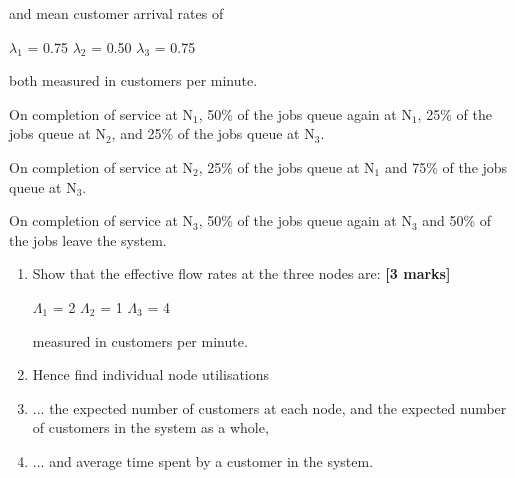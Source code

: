 \begin{enumerate}
\begin{enumerate}
and mean customer arrival rates of

\begin{center}
$\lambda_1$ = 0.75 \hspace*{0.5in} 
$\lambda_2$ = 0.50 \hspace*{0.5in} 
$\lambda_3$ = 0.75
\end{center}

both measured in customers per minute.

On completion of service at N$_1$,
50\% of the jobs queue again at N$_1$,
25\% of the jobs queue at N$_2$, and
25\% of the jobs queue at N$_3$.

On completion of service at N$_2$,
25\% of the jobs queue at N$_1$ and
75\% of the jobs queue at N$_3$.

On completion of service at N$_3$,
50\% of the jobs queue again at N$_3$
and 50\% of the jobs leave the system.

\begin{enumerate}

\item Show that the effective flow rates at the three nodes are:
\hfill {\bf [3 marks]}\\

\begin{center}
$\Lambda_1$ = 2 \hspace*{0.5in} 
$\Lambda_2$ = 1 \hspace*{0.5in} 
$\Lambda_3$ = 4
\end{center}

measured in customers per minute.

\item Hence find individual node utilisations   

\item ... the expected number of customers at each node, and 
the expected number of customers in the system as a whole,



\item ... and average time spent by a customer in the system.  


\end{enumerate}
\end{enumerate}
\end{enumerate}



